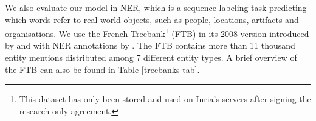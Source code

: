 \begin{table}[ht]
    \centering\small
    \caption{Statistics on the treebanks used in POS tagging, dependency parsing, and NER (FTB).}\label{treebanks-tab}
\end{table}

We also evaluate our model in NER, which is a sequence labeling task predicting which words refer to real-world objects, such as people, locations, artifacts and organisations. We use the French Treebank\footnote{This dataset has only been stored and used on Inria's servers after signing the research-only agreement.} (FTB) \citep{abeille-etal-2003-building} in its 2008 version introduced by \citet{candito-crabbe-2009-improving} and with NER annotations by \citet{sagot-etal-2012-annotation}. The FTB contains more than 11 thousand entity mentions distributed among 7 different entity types. A brief overview of the FTB can also be found in Table \ref{treebanks-tab}.

